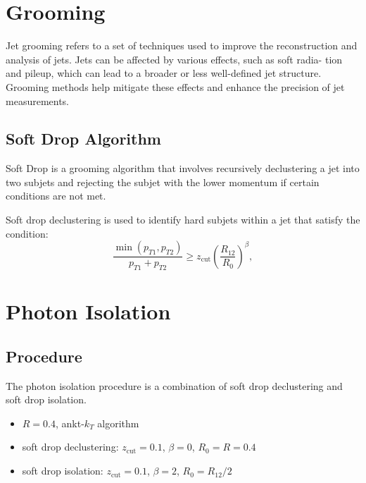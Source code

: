 \documentclass[9pt, mathserif]{beamer}
\begin{document}
    
    \section{Grooming}
        \begin{frame}
            Jet grooming refers to a set of techniques used to improve the reconstruction and analysis of jets. Jets can be affected by various effects, such as soft radia- tion and pileup, which can lead to a broader or less well-defined jet structure. Grooming methods help mitigate these effects and enhance the precision of jet measurements.
        \end{frame}
        \subsection{Soft Drop Algorithm}
            \begin{frame}
                Soft Drop is a grooming algorithm that involves recursively declustering a jet into two subjets and rejecting the subjet with the lower momentum if certain conditions are not met.\par
                Soft drop declustering is used to identify hard subjets within a jet that satisfy the condition:
		        \begin{equation}
			        \frac{\min(p_{T1},p_{T2})}{p_{T1}+p_{T2}}\geq z_{\mathrm{cut}}\left(\frac{R_{12}}{R_0}\right)^{\beta},
		        \end{equation}
            \end{frame}
    
            
    \section{Photon Isolation}
        \subsection{Procedure}
            \begin{frame}
                The photon isolation procedure is a combination of soft drop declustering and soft drop isolation.
                \begin{itemize}
                    \item $R=0.4$, ankt-$k_T$ algorithm
                    \item soft drop declustering: $z_{\mathrm{cut}}=0.1$, $\beta=0$, $R_0=R=0.4$
                    \item soft drop isolation: $z_{\mathrm{cut}}=0.1$, $\beta=2$, $R_0=R_{12}/2$
                \end{itemize}
            \end{frame}
\end{document}
